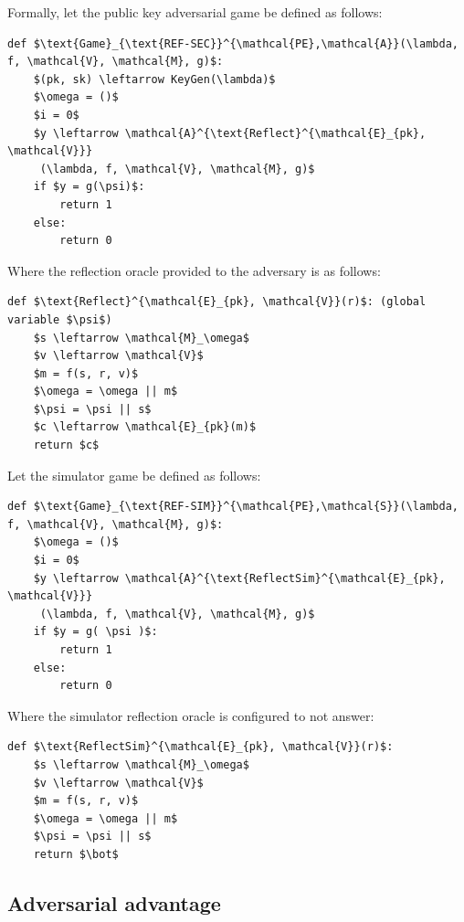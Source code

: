 \documentclass[conference, letterpaper, 10pt]{IEEEtran}
\begin{document}
Formally, let the public key adversarial game be defined as follows:

\begin{lstlisting}[texcl,mathescape,basicstyle=\small]
def $\text{Game}_{\text{REF-SEC}}^{\mathcal{PE},\mathcal{A}}(\lambda, f, \mathcal{V}, \mathcal{M}, g)$:
    $(pk, sk) \leftarrow KeyGen(\lambda)$
    $\omega = ()$
    $i = 0$
    $y \leftarrow \mathcal{A}^{\text{Reflect}^{\mathcal{E}_{pk}, \mathcal{V}}}
     (\lambda, f, \mathcal{V}, \mathcal{M}, g)$
    if $y = g(\psi)$:
        return 1
    else:
        return 0
\end{lstlisting}

Where the reflection oracle provided to the adversary is as follows:

\begin{lstlisting}[texcl,mathescape,basicstyle=\small]
def $\text{Reflect}^{\mathcal{E}_{pk}, \mathcal{V}}(r)$: (global variable $\psi$)
    $s \leftarrow \mathcal{M}_\omega$
    $v \leftarrow \mathcal{V}$
    $m = f(s, r, v)$
    $\omega = \omega || m$
    $\psi = \psi || s$
    $c \leftarrow \mathcal{E}_{pk}(m)$
    return $c$
\end{lstlisting}

Let the simulator game be defined as follows:

\begin{lstlisting}[texcl,mathescape,basicstyle=\small]
def $\text{Game}_{\text{REF-SIM}}^{\mathcal{PE},\mathcal{S}}(\lambda, f, \mathcal{V}, \mathcal{M}, g)$:
    $\omega = ()$
    $i = 0$
    $y \leftarrow \mathcal{A}^{\text{ReflectSim}^{\mathcal{E}_{pk}, \mathcal{V}}}
     (\lambda, f, \mathcal{V}, \mathcal{M}, g)$
    if $y = g( \psi )$:
        return 1
    else:
        return 0
\end{lstlisting}

Where the simulator reflection oracle is configured to not answer:

\begin{lstlisting}[texcl,mathescape,basicstyle=\small]
def $\text{ReflectSim}^{\mathcal{E}_{pk}, \mathcal{V}}(r)$:
    $s \leftarrow \mathcal{M}_\omega$
    $v \leftarrow \mathcal{V}$
    $m = f(s, r, v)$
    $\omega = \omega || m$
    $\psi = \psi || s$
    return $\bot$
\end{lstlisting}

\subsection{Adversarial advantage}\label{subsec:refsecadv}
\end{document}
